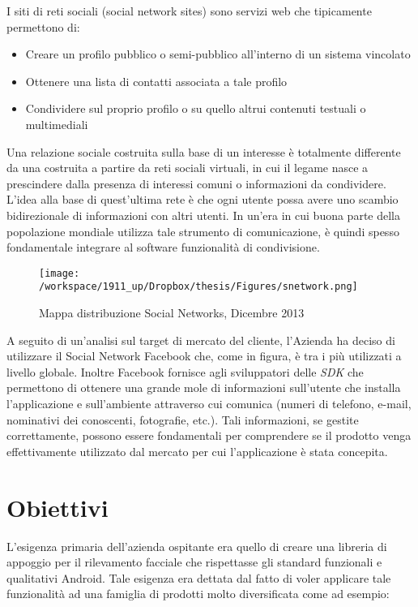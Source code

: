 I siti di reti sociali (social network sites) sono servizi web che tipicamente permettono di:
\begin{itemize}
\item Creare un profilo pubblico o semi-pubblico all'interno di un sistema vincolato
\item Ottenere una lista di contatti associata a tale profilo
\item Condividere sul proprio profilo o su quello altrui contenuti testuali o multimediali
\end{itemize}

Una relazione sociale costruita sulla base di un interesse è totalmente differente da una costruita a partire da reti sociali virtuali, in cui il legame nasce a prescindere dalla presenza di interessi comuni o informazioni da condividere.
L'idea alla base di quest'ultima rete è che ogni utente possa avere uno scambio bidirezionale di informazioni con altri utenti. In un'era in cui buona parte della popolazione mondiale utilizza tale strumento di comunicazione, è quindi spesso fondamentale integrare al software funzionalità di condivisione.

\begin{figure}[H]\centering  
\texttt{[image: /workspace/1911\_up/Dropbox/thesis/Figures/snetwork.png]}
\caption[Mappa distribuzione Social Networks]{Mappa distribuzione Social Networks, Dicembre 2013}
\label{pic-a}
\end{figure}

A seguito di un'analisi sul target di mercato del cliente, l'Azienda ha deciso di utilizzare il Social Network Facebook che, come in figura, è tra i più utilizzati a livello globale. Inoltre Facebook fornisce agli sviluppatori delle \textit{SDK} che permettono di ottenere una grande mole di informazioni sull'utente che installa l'applicazione e sull'ambiente attraverso cui comunica (numeri di telefono, e-mail, nominativi dei conoscenti, fotografie, etc.). Tali informazioni, se gestite correttamente, possono essere fondamentali per comprendere se il prodotto venga effettivamente utilizzato dal mercato per cui l'applicazione è stata concepita.


\section{Obiettivi}

L'esigenza primaria dell'azienda ospitante era quello di creare una libreria di appoggio per il rilevamento facciale che rispettasse gli standard funzionali e qualitativi Android. Tale esigenza era dettata dal fatto di voler applicare tale funzionalità ad una famiglia di prodotti molto diversificata come ad esempio:

